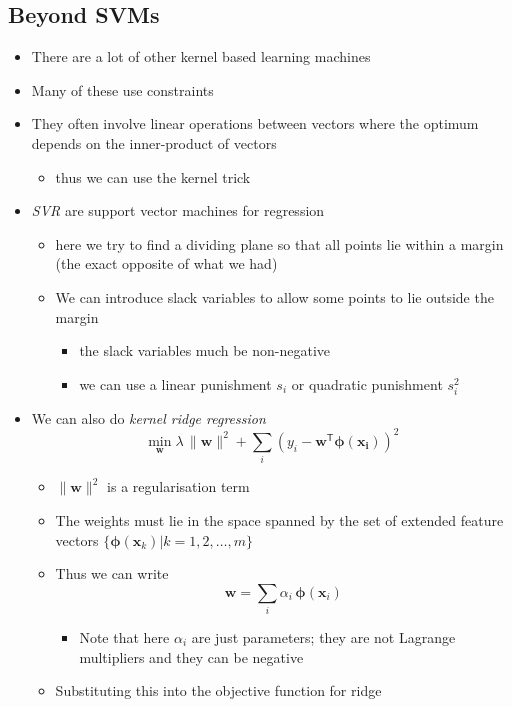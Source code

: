 \documentclass[11pt]{article}
\newcommand{\tr}{\textsf{T}}
\begin{document}
\subsection{Beyond SVMs}
\label{sec:orge261357}
\begin{itemize}
\item There are a lot of other kernel based learning machines
\item Many of these use constraints
\item They often involve linear operations between vectors where the
optimum depends on the inner-product of vectors
\begin{itemize}
\item thus we can use the kernel trick
\end{itemize}
\item \emph{SVR} are support vector machines for regression
\begin{itemize}
\item here we try to find a dividing plane so that all points lie
within a margin (the exact opposite of what we had)
\item We can introduce slack variables to allow some points to lie
outside the margin
\begin{itemize}
\item the slack variables much be non-negative
\item we can use a linear punishment \(s_i\) or quadratic punishment \(s_i^2\)
\end{itemize}
\end{itemize}
\item We can also do \emph{kernel  ridge regression}
$$ \min_{\bm{w}} \lambda\,\| \bm{w} \|^2 + \sum_i \left( y_i -
      \bm{w}^\tr \bm{\phi}(\bm{x_i}) \right)^2 $$
\begin{itemize}
\item \(\| \bm{w} \|^2\) is a regularisation term
\item The weights must lie in the space spanned by the set of extended
feature vectors \(\{\bm{\phi}(\bm{x}_k) | k=1,2,\ldots,m\}\)
\item Thus we can write
$$ \bm{w} = \sum_i \alpha_i \,\bm{\phi}(\bm{x}_i) $$
\begin{itemize}
\item Note that here \(\alpha_i\) are just parameters; they are not
Lagrange multipliers and they can be negative
\end{itemize}
\item Substituting this into the objective function for ridge

\end{itemize}
\end{itemize}
\end{document}
